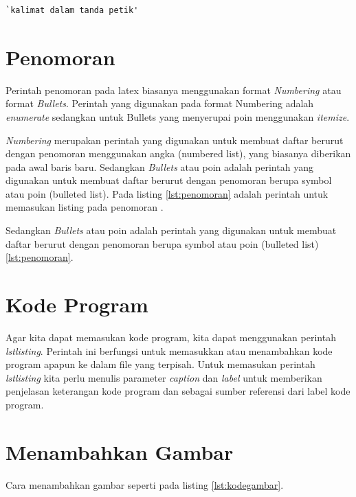 \begin{lstlisting}[caption=Contoh kalimat dalam tanda petik pada Latex,label={lst:tandapetik}]
`kalimat dalam tanda petik'
\end{lstlisting}

\section{Penomoran}
Perintah penomoran pada latex biasanya menggunakan format \textit{Numbering} atau format \textit{Bullets}. Perintah yang digunakan pada format Numbering adalah \textit{enumerate} sedangkan untuk Bullets yang menyerupai poin menggunakan \textit{itemize}.



\textit{Numbering} merupakan perintah yang digunakan untuk membuat daftar berurut dengan penomoran menggunakan angka (numbered list), yang biasanya diberikan pada awal baris baru. Sedangkan \textit{Bullets} atau poin adalah perintah yang digunakan untuk membuat daftar berurut dengan penomoran berupa symbol atau poin (bulleted list). Pada listing \ref{lst:penomoran} adalah perintah untuk memasukan listing pada penomoran .



Sedangkan \textit{Bullets} atau poin adalah perintah yang digunakan untuk membuat daftar berurut dengan penomoran berupa symbol atau poin (bulleted list) \ref{lst:penomoran}.


\section{Kode Program}
Agar kita dapat memasukan kode program, kita dapat menggunakan perintah \textit{lstlisting}. Perintah ini  berfungsi untuk memasukkan atau menambahkan kode program apapun ke dalam file yang terpisah. Untuk memasukan perintah \textit{lstlisting} kita perlu menulis parameter \textit{caption} dan \textit{label} untuk memberikan penjelasan keterangan kode program dan sebagai sumber referensi dari label kode program.



\section{Menambahkan Gambar}
Cara menambahkan gambar seperti pada listing \ref{lst:kodegambar}.



